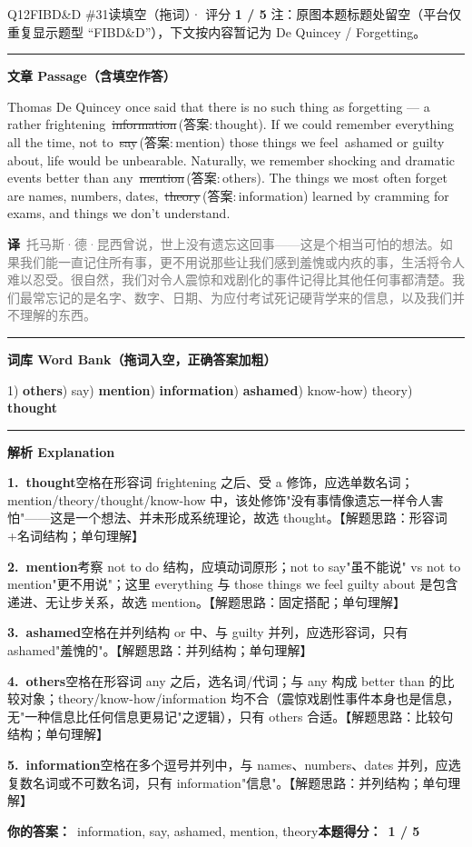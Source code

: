 \documentclass[11pt]{article}
\newcommand{\ptesub}[1]{%
  \par\needspace{2\baselineskip}\smallskip
  {\color{cAccent}\rule[-0.2ex]{3pt}{1.05em}}\hspace{6pt}%
  {\bfseries\color{cHead}#1}\par\nopagebreak\smallskip}
\newcommand{\zh}[1]{{\footnotesize\textcolor{cNote}{\textbf{译}}\ \textcolor{gray}{#1}}}
\newcommand{\rok}[1]{{\color{cFix}\ding{51}\,#1}}                 %
\newcommand{\rno}[2]{{\color{cWrong}\ding{55}\,\sout{#1}}\,{\footnotesize\color{cFix}(答案:\,#2)}}  %
\begin{document}
\begin{qblock}{Q12\quad FIBD\&D \#31}{读填空（拖词）· 评分 \textcolor{cAccent}{\bfseries 1 / 5}}
{\footnotesize\color{gray} 注：原图本题标题处留空（平台仅重复显示题型 ``FIBD\&D''），下文按内容暂记为 De Quincey / Forgetting。}
\ptesub{文章 Passage（含填空作答）}
\begin{promptbox}
Thomas De Quincey once said that there is no such thing as forgetting --- a rather frightening \rno{information}{thought}. If we could remember everything all the time, not to \rno{say}{mention} those things we feel \rok{ashamed} or guilty about, life would be unbearable. Naturally, we remember shocking and dramatic events better than any \rno{mention}{others}. The things we most often forget are names, numbers, dates, \rno{theory}{information} learned by cramming for exams, and things we don't understand.
\end{promptbox}
\zh{托马斯·德·昆西曾说，世上没有遗忘这回事——这是个相当可怕的想法。如果我们能一直记住所有事，更不用说那些让我们感到羞愧或内疚的事，生活将令人难以忍受。很自然，我们对令人震惊和戏剧化的事件记得比其他任何事都清楚。我们最常忘记的是名字、数字、日期、为应付考试死记硬背学来的信息，以及我们并不理解的东西。}
\ptesub{词库 Word Bank（拖词入空，正确答案加粗）}
{\small 1) \textbf{others}) say) \textbf{mention}) \textbf{information}) \textbf{ashamed}) know-how) theory) \textbf{thought}}
\ptesub{解析 Explanation}
\begin{notebox}\footnotesize
\textbf{1.\ thought}\quad 空格在形容词 frightening 之后、受 a 修饰，应选单数名词；mention/theory/thought/know-how 中，该处修饰"没有事情像遗忘一样令人害怕"——这是一个想法、并未形成系统理论，故选 thought。【解题思路：形容词+名词结构；单句理解】\par\smallskip
\textbf{2.\ mention}\quad 考察 not to do 结构，应填动词原形；not to say"虽不能说" vs not to mention"更不用说"；这里 everything 与 those things we feel guilty about 是包含递进、无让步关系，故选 mention。【解题思路：固定搭配；单句理解】\par\smallskip
\textbf{3.\ ashamed}\quad 空格在并列结构 or 中、与 guilty 并列，应选形容词，只有 ashamed"羞愧的"。【解题思路：并列结构；单句理解】\par\smallskip
\textbf{4.\ others}\quad 空格在形容词 any 之后，选名词/代词；与 any 构成 better than 的比较对象；theory/know-how/information 均不合（震惊戏剧性事件本身也是信息，无"一种信息比任何信息更易记"之逻辑），只有 others 合适。【解题思路：比较句结构；单句理解】\par\smallskip
\textbf{5.\ information}\quad 空格在多个逗号并列中，与 names、numbers、dates 并列，应选复数名词或不可数名词，只有 information"信息"。【解题思路：并列结构；单句理解】
\end{notebox}
\smallskip
\textbf{你的答案：}\ {\color{cWrong}information, say}, ashamed, {\color{cWrong}mention, theory}\qquad\textbf{本题得分：}\ {\color{cAccent}\bfseries 1 / 5}
\end{qblock}
\end{document}
